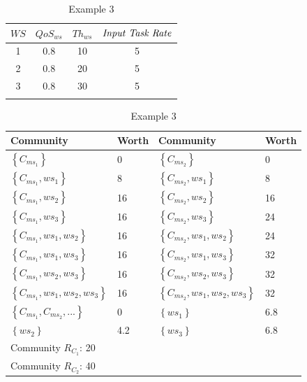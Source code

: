 \documentclass[10pt,journal,cspaper,compsoc]{IEEEtran}
\begin{document}
\begin{table}[!t]
\renewcommand{\arraystretch}{1.3}
\caption{Example 3} \label{example_3} \centering
\begin{tabular}{c c c c}
\hline
$WS$ & $QoS_{ws}$ & $Th_{ws}$ & $\text{\emph{Input Task Rate}}$\\
\hline
1 & 0.8 & 10 & 5\\
2 & 0.8 & 20 & 5\\
3 & 0.8 & 30 & 5\\
\hline\\
\end{tabular}
%
\renewcommand{\arraystretch}{1.3}
\label{example_3_2} \centering
\begin{tabular}{l l || l l}
\hline
Community & Worth & Community & Worth\\
\hline
$\left\{C_{ms_1}\right\}$ & 0 & $\left\{C_{ms_2}\right\}$ & 0\\
$\left\{C_{ms_1}, ws_1\right\}$ & 8 & $\left\{C_{ms_2}, ws_1\right\}$ & 8\\
$\left\{C_{ms_1}, ws_2\right\}$ & 16 & $\left\{C_{ms_2}, ws_2\right\}$ & 16\\
$\left\{C_{ms_1}, ws_3\right\}$ & 16 & $\left\{C_{ms_2}, ws_3\right\}$ & 24\\
$\left\{C_{ms_1}, ws_1, ws_2\right\}$ & 16 & $\left\{C_{ms_2}, ws_1, ws_2\right\}$ & 24\\
$\left\{C_{ms_1}, ws_1, ws_3\right\}$ & 16 & $\left\{C_{ms_2}, ws_1, ws_3\right\}$ & 32\\
$\left\{C_{ms_1}, ws_2, ws_3\right\}$ & 16 & $\left\{C_{ms_2}, ws_2, ws_3\right\}$ & 32\\
$\left\{C_{ms_1}, ws_1, ws_2, ws_3\right\}$ & 16 & $\left\{C_{ms_2}, ws_1, ws_2, ws_3\right\}$ & 32\\
$\left\{C_{ms_1}, C_{ms_2}, ...\right\}$ & 0 & $\left\{ws_1\right\}$ & 6.8\\
$\left\{ws_2\right\}$ & 4.2 & $\left\{ws_3\right\}$ & 6.8\\
\hline
Community $R_{C_1}$: 20 \\ Community $R_{C_2}$: 40\\
\hline
\end{tabular}
\end{table}
\end{document}
